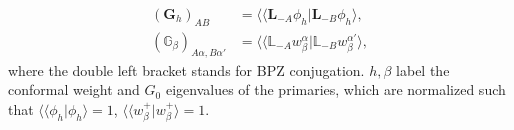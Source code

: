 \documentclass[aps,10pt,twocolumn,superscriptaddress]{revtex4-2}
\def\ie{\begin{equation}\begin{aligned}}
\def\fe{\end{aligned}\end{equation}}
\begin{document}
\ie
(\mathbf{G}_h)_{AB}&=\langle\langle \mathbf{L}_{-A}\phi_h|\mathbf{L}_{-B}\phi_h\rangle,\\
(\mathbb{G}_\beta)_{A\alpha, B\alpha'}&=\langle\langle \mathbb{L}_{-A}w_\beta^\alpha|\mathbb{L}_{-B}w_\beta^{\alpha'}\rangle,
\fe
where the double left bracket stands for BPZ conjugation. $h, \beta$ label the conformal weight and $G_0$ eigenvalues of the primaries, which are normalized such that $\langle\langle \phi_h|\phi_h\rangle =1$, $\langle\langle w_\beta^+|w_\beta^{+} \rangle=1$.

\end{document}
